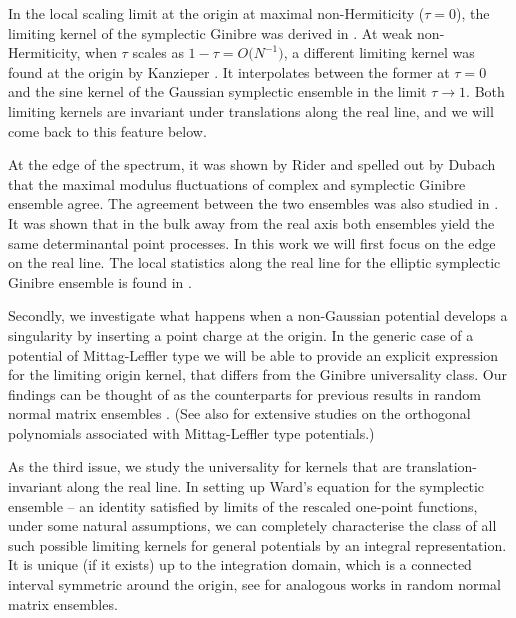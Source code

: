 \documentclass[pdftex]{sigma}
\numberwithin{equation}{section}
\newcommand{\1}{\chi}
\begin{document}
In the local scaling limit at the origin at maximal non-Hermiticity ($\tau=0$), the limiting kernel of the symplectic Ginibre was derived in \cite{MR1928853,Mehta}. At weak non-Hermiticity, when $\tau$ scales as $1-\tau=O\big(N^{-1}\big)$, a different limiting kernel was found at the origin by Kanzieper \cite{MR1928853}. It interpolates between the former
at $\tau=0$ and the sine kernel of the Gaussian symplectic ensemble in the limit $\tau\to1$. Both limiting kernels are invariant under translations along the real line, and we will come back to this feature below.

At the edge of the spectrum, it was shown by Rider \cite{MR1986426} and spelled out by Dubach \cite{Dubach2020} that the maximal modulus fluctuations of complex and symplectic Ginibre ensemble agree.
The agreement between the two ensembles was also studied in \cite{akemann2019universal}. It was shown that in the bulk away from the real axis both ensembles yield the same determinantal point processes. In this work we will first focus on the edge on the real line. The local statistics along the real line for the elliptic symplectic Ginibre ensemble is found in \cite{BE}.

 Secondly, we investigate what happens when a non-Gaussian potential develops a singularity by inserting a point charge at the origin. In the generic case of a potential of Mittag-Leffler type we will be able to provide an explicit expression for the limiting origin kernel,
that differs from the Ginibre universality class.
Our findings can be thought of as the counterparts for previous results in random normal matrix ensembles \cite{ameur2018random,MR1643533}.
(See also \cite{MR3668632,MR3849128,MR3670735} for extensive studies on the orthogonal polynomials associated with Mittag-Leffler type potentials.)

As the third issue, we study the universality for kernels that are translation-invariant along the real line. In setting up Ward's equation for the symplectic ensemble -- an identity satisfied by limits of the rescaled one-point functions, under some natural assumptions, we can completely characterise the class of all such possible limiting kernels for general potentials by an integral representation. It is unique (if it exists) up to the integration domain, which is a connected interval symmetric around the origin, see \cite{MR3975882,MR4030288} for analogous works in random normal matrix ensembles.
\end{document}
